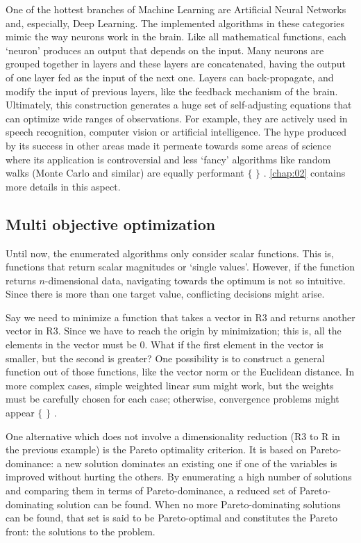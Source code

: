One of the hottest branches of Machine Learning are Artificial Neural Networks and, especially, Deep Learning. The implemented algorithms in these categories mimic the way neurons work in the brain. Like all mathematical functions, each ‘neuron’ produces an output that depends on the input. Many neurons are grouped together in layers and these layers are concatenated, having the output of one layer fed as the input of the next one. Layers can back-propagate, and modify the input of previous layers, like the feedback mechanism of the brain. Ultimately, this construction generates a huge set of self-adjusting equations that can optimize wide ranges of observations. For example, they are actively used in speech recognition, computer vision or artificial intelligence. The hype produced by its success in other areas made it permeate towards some areas of science where its application is controversial and less ‘fancy’ algorithms like random walks (Monte Carlo and similar) are equally performant $ \{ $ $ \} $ . \autoref{chap:02} contains more details in this aspect.

\subsection{Multi objective optimization}
Until now, the enumerated algorithms only consider scalar functions. This is, functions that return scalar magnitudes or ‘single values’. However, if the function returns $n$-dimensional data, navigating towards the optimum is not so intuitive. Since there is more than one target value, conflicting decisions might arise.

Say we need to minimize a function that takes a vector in R3 and returns another vector in R3. Since we have to reach the origin by minimization; this is, all the elements in the vector must be 0. What if the first element in the vector is smaller, but the second is greater? One possibility is to construct a general function out of those functions, like the vector norm or the Euclidean distance. In more complex cases, simple weighted linear sum might work, but the weights must be carefully chosen for each case; otherwise, convergence problems might appear $ \{ $ $ \} $ .

One alternative which does not involve a dimensionality reduction (R3 to R in the previous example) is the Pareto optimality criterion. It is based on Pareto-dominance: a new solution dominates an existing one if one of the variables is improved without hurting the others. By enumerating a high number of solutions and comparing them in terms of Pareto-dominance, a reduced set of Pareto-dominating solution can be found. When no more Pareto-dominating solutions can be found, that set is said to be Pareto-optimal and constitutes the Pareto front: the solutions to the problem.

